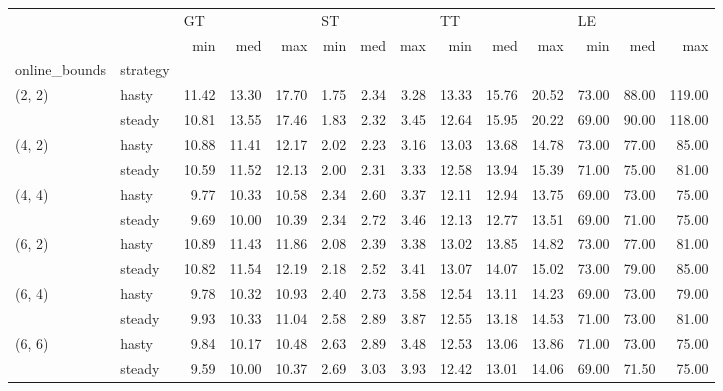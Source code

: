 \begin{tabular}{llrrrrrrrrrrrr}
\toprule
       &        & \multicolumn{3}{l}{GT} & \multicolumn{3}{l}{ST} & \multicolumn{3}{l}{TT} & \multicolumn{3}{l}{LE} \\
       &        &   min &   med &   max &  min &  med &  max &   min &   med &   max &   min &   med &    max \\
online\_bounds & strategy &       &       &       &      &      &      &       &       &       &       &       &        \\
\midrule
(2, 2) & hasty & 11.42 & 13.30 & 17.70 & 1.75 & 2.34 & 3.28 & 13.33 & 15.76 & 20.52 & 73.00 & 88.00 & 119.00 \\
       & steady & 10.81 & 13.55 & 17.46 & 1.83 & 2.32 & 3.45 & 12.64 & 15.95 & 20.22 & 69.00 & 90.00 & 118.00 \\
(4, 2) & hasty & 10.88 & 11.41 & 12.17 & 2.02 & 2.23 & 3.16 & 13.03 & 13.68 & 14.78 & 73.00 & 77.00 &  85.00 \\
       & steady & 10.59 & 11.52 & 12.13 & 2.00 & 2.31 & 3.33 & 12.58 & 13.94 & 15.39 & 71.00 & 75.00 &  81.00 \\
(4, 4) & hasty &  9.77 & 10.33 & 10.58 & 2.34 & 2.60 & 3.37 & 12.11 & 12.94 & 13.75 & 69.00 & 73.00 &  75.00 \\
       & steady &  9.69 & 10.00 & 10.39 & 2.34 & 2.72 & 3.46 & 12.13 & 12.77 & 13.51 & 69.00 & 71.00 &  75.00 \\
(6, 2) & hasty & 10.89 & 11.43 & 11.86 & 2.08 & 2.39 & 3.38 & 13.02 & 13.85 & 14.82 & 73.00 & 77.00 &  81.00 \\
       & steady & 10.82 & 11.54 & 12.19 & 2.18 & 2.52 & 3.41 & 13.07 & 14.07 & 15.02 & 73.00 & 79.00 &  85.00 \\
(6, 4) & hasty &  9.78 & 10.32 & 10.93 & 2.40 & 2.73 & 3.58 & 12.54 & 13.11 & 14.23 & 69.00 & 73.00 &  79.00 \\
       & steady &  9.93 & 10.33 & 11.04 & 2.58 & 2.89 & 3.87 & 12.55 & 13.18 & 14.53 & 71.00 & 73.00 &  81.00 \\
(6, 6) & hasty &  9.84 & 10.17 & 10.48 & 2.63 & 2.89 & 3.48 & 12.53 & 13.06 & 13.86 & 71.00 & 73.00 &  75.00 \\
       & steady &  9.59 & 10.00 & 10.37 & 2.69 & 3.03 & 3.93 & 12.42 & 13.01 & 14.06 & 69.00 & 71.50 &  75.00 \\
\bottomrule
\end{tabular}
